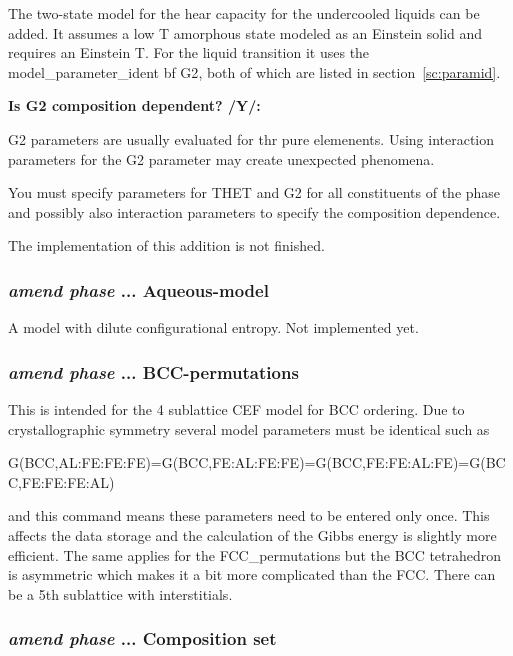 \documentclass[11pt]{article}
\begin{document}
The two-state model for the hear capacity for the undercooled liquids
can be added.  It assumes a low T amorphous state modeled as an
Einstein solid and requires an Einstein T.  For the liquid transition
it uses the model\_parameter\_ident {bf G2}, both of which are listed
in section~\ref{sc:paramid}.

{\bf Is G2 composition dependent? /Y/:}

G2 parameters are usually evaluated for thr pure elemenents.  Using
interaction parameters for the G2 parameter may create unexpected
phenomena.

You must specify parameters for THET and G2 for all constituents of
the phase and possibly also interaction parameters to specify the
composition dependence.

The implementation of this addition is not finished.


\hypertarget{Addition aqueus-model}{}
\subsubsection{{\em amend phase} ... Aqueous-model}

A model with dilute configurational entropy.  Not implemented yet.

\hypertarget{Amend BCC-permutations}{}
\subsubsection{{\em amend phase} ... BCC-permutations}

This is intended for the 4 sublattice CEF model for BCC ordering.  Due
to crystallographic symmetry several model parameters must be
identical such as

G(BCC,AL:FE:FE:FE)=G(BCC,FE:AL:FE:FE)=G(BCC,FE:FE:AL:FE)=G(BCC,FE:FE:FE:AL)

and this command means these parameters need to be entered only once.
This affects the data storage and the calculation of the Gibbs energy
is slightly more efficient.  The same applies for the
FCC\_permutations but the BCC tetrahedron is asymmetric which makes it
a bit more complicated than the FCC.  There can be a 5th sublattice
with interstitials.

\hypertarget{Add new cs}{}
\subsubsection{{\em amend phase} ... Composition set}\label{sc:amend_phase_cs}
\end{document}
